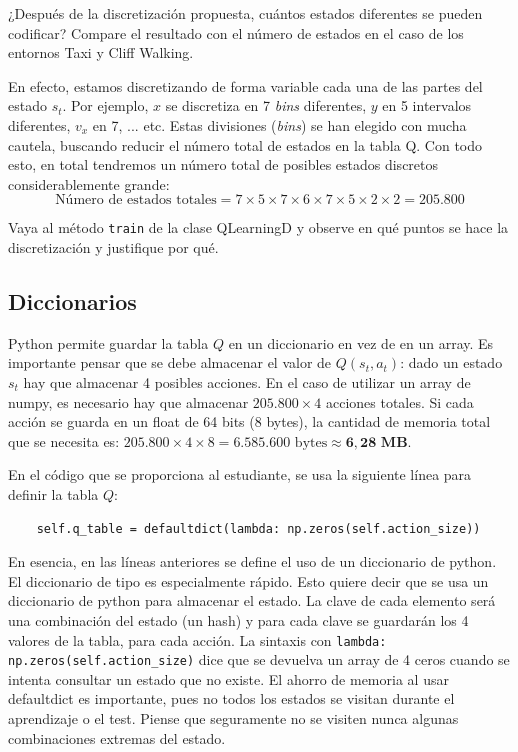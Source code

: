 \documentclass{article}
\begin{document}


\begin{exercise}
    ¿Después de la discretización propuesta, cuántos estados diferentes se pueden codificar? Compare el resultado con el número de estados en el caso de los entornos Taxi y Cliff Walking.
\end{exercise}

En efecto, estamos discretizando de forma variable cada una de las partes del estado $s_t$. Por ejemplo, $x$ se discretiza en 7 \textit{bins} diferentes, $y$ en 5 intervalos diferentes, $v_x$ en 7, ... etc. Estas divisiones (\textit{bins}) se han elegido con mucha cautela, buscando reducir el número total de estados en la tabla Q. Con todo esto, en total tendremos un número total de posibles estados discretos considerablemente grande:
$$\text{Número de estados totales} = 7 \times 5 \times 7 \times 6 \times 7 \times 5 \times 2 \times 2=\mathbf{205.800}$$

\begin{exercise}
    Vaya al método \texttt{train} de la clase QLearningD y observe en qué puntos se hace la discretización y justifique por qué.
\end{exercise}

\subsection{Diccionarios}
Python permite guardar la tabla $Q$ en un diccionario en vez de en un array. Es importante pensar que se debe almacenar el valor de $Q(s_t, a_t)$: dado un estado $s_t$ hay que almacenar 4 posibles acciones.
En el caso de utilizar un array de numpy, es necesario hay que almacenar $\mathbf{205.800}\times4$ acciones totales. Si cada acción se guarda en un float de 64 bits (8 bytes), la cantidad de memoria total que se necesita es: $\mathbf{205.800}\times4\times8=6.585.600 \text{ bytes} \approx \mathbf{6,28 \text{ MB}}$.

En el código que se proporciona al estudiante, se usa la siguiente línea para definir la tabla $Q$:
\begin{verbatim}
    self.q_table = defaultdict(lambda: np.zeros(self.action_size))
\end{verbatim}
En esencia, en las líneas anteriores se define el uso de un diccionario de python. El diccionario de tipo {\textttdefaultdict} es especialmente rápido. Esto quiere decir que se usa un diccionario de python para almacenar el estado. La clave de cada elemento será una combinación del estado (un hash) y para cada clave se guardarán los 4 valores de la tabla, para cada acción. La sintaxis con \texttt{lambda: np.zeros(self.action\_size)} dice que se devuelva un array de 4 ceros cuando se intenta consultar un estado que no existe. El ahorro de memoria al usar defaultdict es importante, pues no todos los estados se visitan durante el aprendizaje o el test. Piense que seguramente no se visiten nunca algunas combinaciones extremas del estado. 
\end{document}
